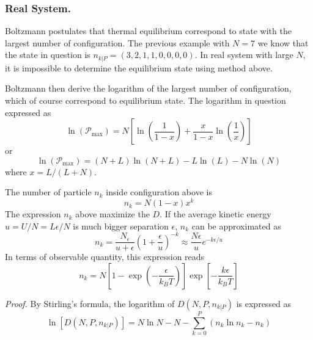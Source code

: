 \documentclass[../../../Main.tex]{subfiles}
\begin{document}
\subsubsection*{ Real\textsuperscript{\texttrademark} System.} Boltzmann postulates that thermal equilibrium correspond to state with the largest number of configuration. The previous example with $N=7$ we know that the state in question is $n_{k|P}=(3, 2, 1, 1, 0, 0, 0, 0)$. In real system with large $N$, it is impossible to determine the equilibrium state using method above.

Boltzmann then derive the logarithm of the largest number of configuration, which of course correspond to equilibrium state. The logarithm in question expressed as 
\begin{equation*}
    \ln(\mathcal{P}_\text{max})=N\left[\ln \left(\frac{1}{1-x}\right)+\frac{x}{1-x}\ln \left(\frac{1}{x}\right)\right]
\end{equation*}
or
\begin{equation*}
    \ln(\mathcal{P}_\text{max})= (N+L)\ln (N+L) - L\ln (L)-N\ln (N)
\end{equation*}
where $x=L/(L+N)$. 

The number of particle $n_k$ inside configuration above is 
\begin{equation*}
    n_k=N(1-x)x^k
\end{equation*}
The expression $n_k$ above maximize the $D$. If the average kinetic energy $u=U/N=L\epsilon/N$ is much bigger separation $\epsilon$, $n_k$ can be approximated as 
\begin{equation*}
    n_k=\frac{N_\epsilon}{u+\epsilon}\left(1+\frac{\epsilon}{u}\right)^{-k}\approx\frac{N\epsilon}{u}e^{-k\epsilon/u}
\end{equation*}
In terms of observable quantity, this expression reads 
\begin{equation*}
    n_k=N\left[1-\exp\left(-\frac{\epsilon}{k_BT}\right)\right]\exp\left[-\frac{k\epsilon}{k_BT}\right]
\end{equation*}

\emph{Proof.} By Stirling’s formula, the logarithm of $D(N , P, n_{k|P} )$ is expressed as
\begin{equation*}
    \ln\left[D(N , P, n_{k|P} )\right]=N\ln N-N-\sum_{k=0}^{P}\left(n_k\ln n_k-n_k\right)
\end{equation*}
\end{document}
